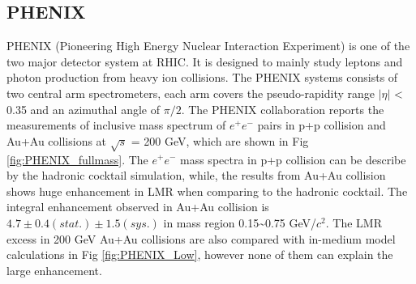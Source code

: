 \subsection{PHENIX}

PHENIX (Pioneering High Energy Nuclear Interaction Experiment) is
one of the two major detector system at RHIC. It is designed to mainly
study leptons and photon production from heavy ion collisions. The
PHENIX systems consists of two central arm spectrometers, each arm
covers the pseudo-rapidity range $|\eta|$ < 0.35 and an azimuthal
angle of $\pi/2$. The PHENIX collaboration reports the measurements
of inclusive mass spectrum of $e^{+}e^{-}$ pairs in p+p collision
and Au+Au collisions at $\sqrt{s}$ = 200 GeV, which are shown in
Fig \ref{fig:PHENIX_fullmass}. The $e^{+}e^{-}$ mass spectra in
p+p collision can be describe by the hadronic cocktail simulation,
while, the results from Au+Au collision shows huge enhancement in
LMR when comparing to the hadronic cocktail. The integral enhancement
observed in Au+Au collision is $4.7\pm0.4(stat.)\pm1.5(sys.)$\cite{PhysRevC.81.034911}
in mass region 0.15\textasciitilde{}0.75 GeV/$c^{2}$. The LMR excess
in 200 GeV Au+Au collisions are also compared with in-medium model
calculations in Fig \ref{fig:PHENIX_Low}, however none of them can
explain the large enhancement.

